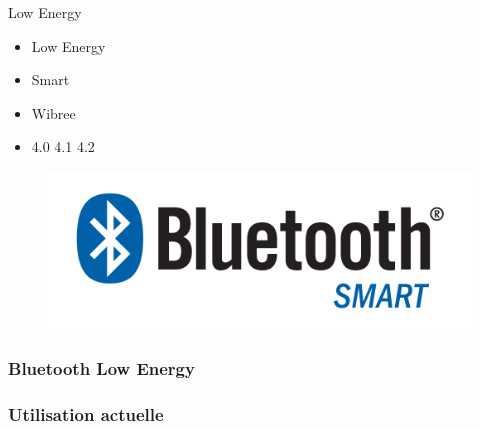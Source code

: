 \begin{frame}
\begin{minipage}[t]{0.30\linewidth}
		\begin{block}{Low Energy}
			\begin{itemize}
				\item Low Energy
				\item Smart
				\item Wibree
				\item 4.0 4.1 4.2
			\end{itemize}
		\end{block}
		\begin{figure}
			\includegraphics[width=\linewidth]{img/Bluetooth_Smart_Logo.png}
		\end{figure}
	\end{minipage}
\end{frame}

\begin{frame}
	\frametitle{Bluetooth Low Energy}
\end{frame}

\begin{frame}
	\frametitle{Utilisation actuelle}
\end{frame}


